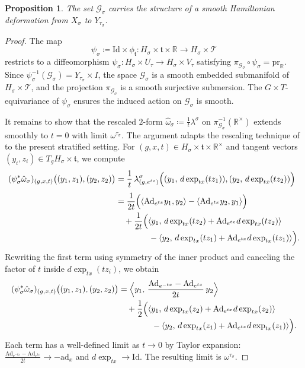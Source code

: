 \documentclass[reqno]{amsart}
\theoremstyle{plain}
\newtheorem{Prop}[Thm]{Proposition}
\theoremstyle{definition}
\begin{document}
\begin{Prop}\label{good prop}
The set $\mathcal{G}_\sigma$ carries the structure of a smooth Hamiltonian deformation from $X_\sigma$ to $Y_{\tau_\sigma}$.
\end{Prop}

\begin{proof}
The map 
\[
\psi_\sigma \coloneqq \mathrm{Id}\times \phi_{\mathfrak t} :
H_\sigma \times \mathfrak t \times \mathbb R \longrightarrow 
H_\sigma \times \mathcal T
\]
restricts to a diffeomorphism $\psi_\sigma : H_\sigma \times U_\tau \to H_\sigma \times V_\tau$ satisfying $\pi_{\mathcal G_\sigma}\circ \psi_\sigma=\mathrm{pr}_{\mathbb R}$. Since $\psi_\sigma^{-1}(\mathcal G_\sigma)=Y_{\tau_\sigma}\times I$, the space $\mathcal G_\sigma$ is a smooth embedded submanifold of $H_\sigma\times \mathcal T$, and the projection $\pi_{\mathcal G_\sigma}$ is a smooth surjective submersion. The $G\times T$-equivariance of $\psi_\sigma$ ensures the induced action on $\mathcal G_\sigma$ is smooth.

It remains to show that the rescaled $2$-form $\hat\omega_\sigma \coloneqq \frac{1}{t}\lambda^\sigma$ on $\pi_{\mathcal G_\sigma}^{-1}(\mathbb R^\times)$ extends smoothly to $t=0$ with limit $\omega^{\tau_\sigma}$. The argument adapts the rescaling technique of \cite[Theorem~4.1]{JMM2025deformations} to the present stratified setting. For $(g,x,t)\in H_\sigma\times \mathfrak t\times \mathbb R^\times$ and tangent vectors $(y_i,z_i)\in T_gH_\sigma \times \mathfrak t$, we compute
\begin{align*}
(\psi_\sigma^*\hat\omega_\sigma)_{(g,x,t)}
\bigl((y_1,z_1),(y_2,z_2)\bigr)
&=
\frac{1}{t}\,
\lambda^\sigma_{(g,e^{tx})}
\Bigl(
(y_1,\, d\exp_{tx}(t z_1)),
(y_2,\, d\exp_{tx}(t z_2))
\Bigr)
\\[0.3em]
&=
\frac{1}{2t}
\Bigl(
\langle \mathrm{Ad}_{e^{tx}}y_1, y_2\rangle
-
\langle \mathrm{Ad}_{e^{tx}}y_2, y_1\rangle
\Bigr)
\\
&\quad
+\frac{1}{2t}
\Bigl(
\langle y_1,\, d\exp_{tx}(t z_2)+\mathrm{Ad}_{e^{tx}}d\exp_{tx}(t z_2)\rangle
\\[-0.2em]
&\qquad\qquad
-
\langle y_2,\, d\exp_{tx}(t z_1)+\mathrm{Ad}_{e^{tx}}d\exp_{tx}(t z_1)\rangle
\Bigr).
\end{align*}
Rewriting the first term using symmetry of the inner product and canceling the factor of $t$ inside $d\exp_{tx}(t z_i)$, we obtain
\begin{align*}
(\psi_\sigma^*\hat\omega_\sigma)_{(g,x,t)}
\bigl((y_1,z_1),(y_2,z_2)\bigr)
&=
\Bigl\langle 
y_1,\,
\frac{\mathrm{Ad}_{e^{-tx}}-\mathrm{Ad}_{e^{tx}}}{2t}\,y_2
\Bigr\rangle
\\
&\quad
+\frac{1}{2}
\Bigl(
\langle y_1,\, d\exp_{tx}(z_2)+\mathrm{Ad}_{e^{tx}}d\exp_{tx}(z_2)\rangle
\\[-0.2em]
&\qquad\qquad
-
\langle y_2,\, d\exp_{tx}(z_1)+\mathrm{Ad}_{e^{tx}}d\exp_{tx}(z_1)\rangle
\Bigr).
\end{align*}
Each term has a well-defined limit as $t\to 0$ by Taylor expansion: $\frac{\mathrm{Ad}_{e^{-tx}}-\mathrm{Ad}_{e^{tx}}}{2t} \to -\mathrm{ad}_x$ and $d\exp_{tx} \to \mathrm{Id}$. The resulting limit is $\omega^{\tau_\sigma}$.
\end{proof}
\end{document}
